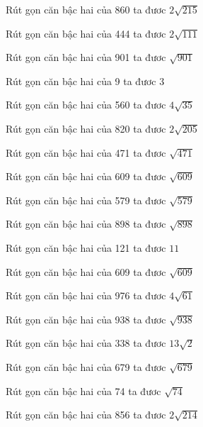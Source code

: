 \documentclass[12pt,a4paper]{article}
\begin{document}
\begin{ex}
Rút gọn căn bậc hai của 860 ta đươc $2\sqrt{215}$
\end{ex}
\begin{ex}
Rút gọn căn bậc hai của 444 ta đươc $2\sqrt{111}$
\end{ex}
\begin{ex}
Rút gọn căn bậc hai của 901 ta đươc $\sqrt{901}$
\end{ex}
\begin{ex}
Rút gọn căn bậc hai của 9 ta đươc $3$
\end{ex}
\begin{ex}
Rút gọn căn bậc hai của 560 ta đươc $4\sqrt{35}$
\end{ex}
\begin{ex}
Rút gọn căn bậc hai của 820 ta đươc $2\sqrt{205}$
\end{ex}
\begin{ex}
Rút gọn căn bậc hai của 471 ta đươc $\sqrt{471}$
\end{ex}
\begin{ex}
Rút gọn căn bậc hai của 609 ta đươc $\sqrt{609}$
\end{ex}
\begin{ex}
Rút gọn căn bậc hai của 579 ta đươc $\sqrt{579}$
\end{ex}
\begin{ex}
Rút gọn căn bậc hai của 898 ta đươc $\sqrt{898}$
\end{ex}
\begin{ex}
Rút gọn căn bậc hai của 121 ta đươc $11$
\end{ex}
\begin{ex}
Rút gọn căn bậc hai của 609 ta đươc $\sqrt{609}$
\end{ex}
\begin{ex}
Rút gọn căn bậc hai của 976 ta đươc $4\sqrt{61}$
\end{ex}
\begin{ex}
Rút gọn căn bậc hai của 938 ta đươc $\sqrt{938}$
\end{ex}
\begin{ex}
Rút gọn căn bậc hai của 338 ta đươc $13\sqrt{2}$
\end{ex}
\begin{ex}
Rút gọn căn bậc hai của 679 ta đươc $\sqrt{679}$
\end{ex}
\begin{ex}
Rút gọn căn bậc hai của 74 ta đươc $\sqrt{74}$
\end{ex}
\begin{ex}
Rút gọn căn bậc hai của 856 ta đươc $2\sqrt{214}$
\end{ex}
\end{document}
